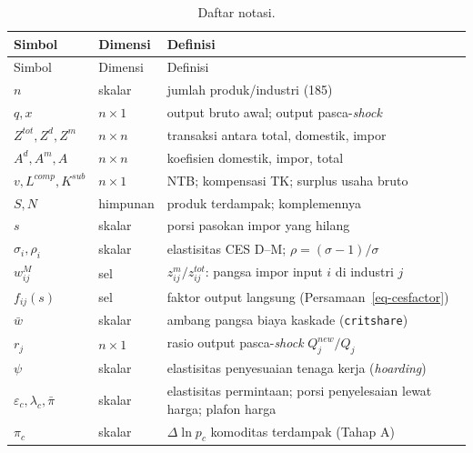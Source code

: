 \documentclass[
  manuscript=article,
  layout=publish,
  year=2026,
  volume=1,
]{den}
\begin{document}
\begin{longtable}[]{@{}
  >{\raggedright\arraybackslash}p{}
  >{\raggedright\arraybackslash}p{}
  >{\raggedright\arraybackslash}p{}@{}}
\caption{Daftar notasi.}\label{tbl-notasi}\tabularnewline
\toprule\noalign{}
\begin{minipage}[b]{\linewidth}\raggedright
Simbol
\end{minipage} & \begin{minipage}[b]{\linewidth}\raggedright
Dimensi
\end{minipage} & \begin{minipage}[b]{\linewidth}\raggedright
Definisi
\end{minipage} \\
\midrule\noalign{}
\endfirsthead
\toprule\noalign{}
\begin{minipage}[b]{\linewidth}\raggedright
Simbol
\end{minipage} & \begin{minipage}[b]{\linewidth}\raggedright
Dimensi
\end{minipage} & \begin{minipage}[b]{\linewidth}\raggedright
Definisi
\end{minipage} \\
\midrule\noalign{}
\endhead
\bottomrule\noalign{}
\endlastfoot
\(n\) & skalar & jumlah produk/industri (185) \\
\(q, x\) & \(n\times1\) & output bruto awal; output
pasca-\emph{shock} \\
\(Z^{tot}, Z^{d}, Z^{m}\) & \(n\times n\) & transaksi antara total,
domestik, impor \\
\(A^{d}, A^{m}, A\) & \(n\times n\) & koefisien domestik, impor,
total \\
\(v, L^{comp}, K^{sub}\) & \(n\times1\) & NTB; kompensasi TK; surplus
usaha bruto \\
\(S, N\) & himpunan & produk terdampak; komplemennya \\
\(s\) & skalar & porsi pasokan impor yang hilang \\
\(\sigma_i, \rho_i\) & skalar & elastisitas CES D--M;
\(\rho=(\sigma{-}1)/\sigma\) \\
\(w^{M}_{ij}\) & sel & \(z^m_{ij}/z^{tot}_{ij}\): pangsa impor input
\(i\) di industri \(j\) \\
\(f_{ij}(s)\) & sel & faktor output langsung
(Persamaan~\ref{eq-cesfactor}) \\
\(\bar w\) & skalar & ambang pangsa biaya kaskade
(\texttt{critshare}) \\
\(r_j\) & \(n\times1\) & rasio output pasca-\emph{shock}
\(Q^{new}_j/Q_j\) \\
\(\psi\) & skalar & elastisitas penyesuaian tenaga kerja
(\emph{hoarding}) \\
\(\varepsilon_c, \lambda_c, \bar\pi\) & skalar & elastisitas permintaan;
porsi penyelesaian lewat harga; plafon harga \\
\(\pi_c\) & skalar & \(\Delta\ln p_c\) komoditas terdampak (Tahap A) \\
\end{longtable}
\end{document}
